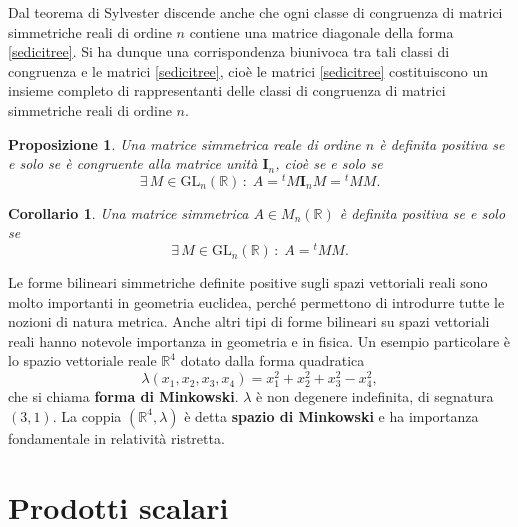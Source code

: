 \documentclass{article}
\theoremstyle{plain}
\newtheorem{prop}[thm]{Proposizione}
\newtheorem{cor}{Corollario}
\theoremstyle{definition}
\theoremstyle{remark}
\begin{document}
Dal teorema di Sylvester discende anche che ogni classe di congruenza di matrici simmetriche reali di ordine $n$ contiene una 
matrice diagonale della forma \ref{sedicitree}. Si ha dunque una corrispondenza biunivoca tra tali classi di congruenza 
e le matrici \ref{sedicitree}, cioè le matrici \ref{sedicitree} costituiscono un insieme completo di rappresentanti delle 
classi di congruenza di matrici simmetriche reali di ordine $n$.

\vspace{10pt}

\begin{bxthm}
\begin{prop}
Una matrice simmetrica reale di ordine $n$ è definita positiva se e solo se è congruente alla matrice unità $\mathbf{I}_n$, 
cioè se e solo se 
\[\exists\,M \in \mathrm{GL}_n(\mathbb{R})\,:\;A = {}^tM \mathbf{I}_n M = {}^tMM.\]
\end{prop}
\end{bxthm}

\vspace{10pt}

\begin{bxthm}
\begin{cor}
    Una matrice simmetrica $A \in M_n(\mathbb{R})$ è definita positiva se e solo se 
    \[\exists\,M \in \mathrm{GL}_n(\mathbb{R})\,:\;A = {}^tMM.\]
\end{cor}
\end{bxthm}

\vspace{10pt}

Le forme bilineari simmetriche definite positive sugli spazi vettoriali reali sono molto importanti in geometria euclidea, perché permettono di introdurre tutte le nozioni di natura metrica. Anche altri tipi di forme bilineari su spazi vettoriali reali hanno notevole importanza in geometria e in fisica. Un esempio particolare è lo spazio vettoriale reale $\mathbb{R}^4$ dotato dalla forma quadratica
\[\lambda(x_1, x_2, x_3, x_4) = x_1^2 + x_2^2 + x_3^2 - x_4^2,\]
che si chiama \textbf{forma di Minkowski}. $\lambda$ è non degenere indefinita, di segnatura $(3, 1)$. 
La coppia $(\mathbb{R}^4, \lambda)$ è detta \textbf{spazio di Minkowski} e ha importanza fondamentale in relatività ristretta.

\vspace{50pt}
\section{Prodotti scalari}
\vspace{20pt}
\end{document}
